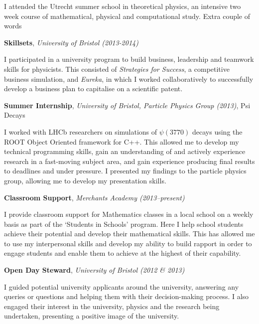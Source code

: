 \documentclass[11pt,a4paper,sans]{moderncv}
\begin{document}
I attended the Utrecht summer school in theoretical physics, an intensive two
week course of mathematical, physical and computational study. {{ Extra couple
of words }}

\vspace{1em}

{\large\textbf{Skillsets}, \textit{University of Bristol (2013-2014)}}

I participated in a university program to build business, leadership and
teamwork skills for physicists. This consisted of \textit{Strategies for
Success}, a competitive business simulation, and \textit{Eureka}, in which I
worked collaboratively to successfully develop a business plan to capitalise on
a scientific patent.

\vspace{1em}

{\large\textbf{Summer Internship}, \textit{University of Bristol, Particle
Physics Group (2013)}, Psi Decays}

I worked with LHCb researchers on simulations of $\psi(3770)$ decays using the
ROOT Object Oriented framework for C++. This allowed me to develop my technical
programming skills, gain an understanding of and actively experience research in
a fast-moving subject area, and gain experience producing final results to
deadlines and under pressure. I presented my findings to the particle physics
group, allowing me to develop my presentation skills.
    
\vspace{1em}

{\large\textbf{Classroom Support}, \textit{Merchants Academy (2013--present)}}

I provide classroom support for Mathematics classes in a local school on a
weekly basis as part of the `Students in Schools' program. Here I help school
students achieve their potential and develop their mathematical skills. This has
allowed me to use my interpersonal skills and develop my ability to build
rapport in order to engage students and enable them to achieve at the highest of
their capability.

\vspace{1em}

{\large\textbf{Open Day Steward}, \textit{University of Bristol (2012 \& 2013)}
}

I guided potential university applicants around the university, answering any
queries or questions and helping them with their decision-making process. I also
engaged their interest in the university, physics and the research being
undertaken, presenting a positive image of the university.
    
\end{document}
